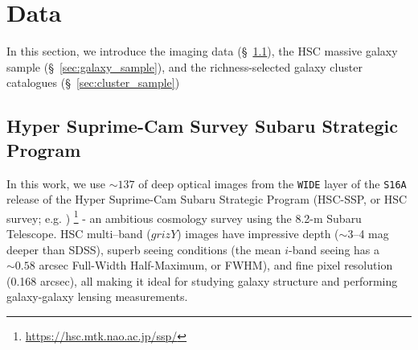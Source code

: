 \documentclass[fleqn,usenatbib,useAMS]{mnras}
\begin{document}
\section{Data}
    \label{sec:data}

    In this section, we introduce the imaging data  (\S\ \ref{sec:hsc}), the HSC massive
    galaxy sample (\S\ \ref{sec:galaxy_sample}), and the richness-selected galaxy cluster
    catalogues (\S\ \ref{sec:cluster_sample})

\subsection{Hyper Suprime-Cam Survey Subaru Strategic Program}
    \label{sec:hsc}

    In this work, we use $\sim 137$ \sqdeg{} of deep optical images from the \texttt{WIDE}
    layer of the \texttt{S16A} release of the Hyper Suprime-Cam Subaru Strategic Program
    (HSC-SSP, or HSC survey; e.g. \citealt{HSC-SSP, HSC-DR1, HSC-DR2})
    \footnote{\url{https://hsc.mtk.nao.ac.jp/ssp/}} - an ambitious cosmology survey using the
    8.2-m Subaru Telescope.
    HSC multi--band ($grizY$) images have impressive depth ($\sim$3--4 mag deeper than
    SDSS), superb seeing conditions (the mean $i$-band seeing has a $\sim 0.58$ arcsec Full-Width
    Half-Maximum, or FWHM), and fine pixel resolution (0.168 arcsec), all making it ideal
    for studying galaxy structure and performing galaxy-galaxy lensing measurements.
\end{document}
